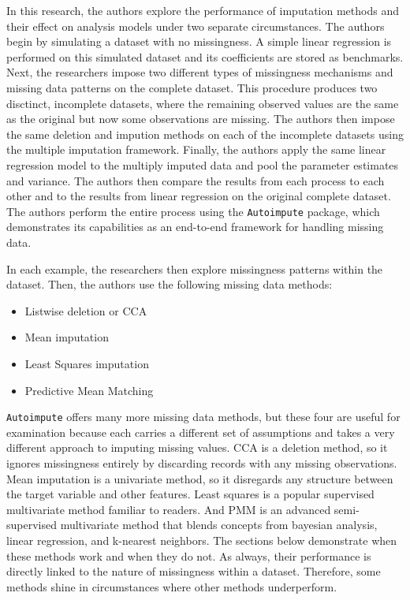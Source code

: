 \documentclass[12pt,oneside]{chicagocapstone}
\providecommand{\tightlist}{%
  \setlength{\itemsep}{0pt}\setlength{\parskip}{0pt}}
\begin{document}
In this research, the authors explore the performance of imputation
methods and their effect on analysis models under two separate
circumstances. The authors begin by simulating a dataset with no
missingness. A simple linear regression is performed on this simulated
dataset and its coefficients are stored as benchmarks. Next, the
researchers impose two different types of missingness mechanisms and
missing data patterns on the complete dataset. This procedure produces
two disctinct, incomplete datasets, where the remaining observed values
are the same as the original but now some observations are missing. The
authors then impose the same deletion and impution methods on each of
the incomplete datasets using the multiple imputation framework.
Finally, the authors apply the same linear regression model to the
multiply imputed data and pool the parameter estimates and variance. The
authors then compare the results from each process to each other and to
the results from linear regression on the original complete dataset. The
authors perform the entire process using the \texttt{Autoimpute}
package, which demonstrates its capabilities as an end-to-end framework
for handling missing data.

In each example, the researchers then explore missingness patterns
within the dataset. Then, the authors use the following missing data
methods:
\begin{itemize}
\tightlist
\item
  Listwise deletion or CCA
\item
  Mean imputation
\item
  Least Squares imputation
\item
  Predictive Mean Matching
\end{itemize}
\texttt{Autoimpute} offers many more missing data methods, but these
four are useful for examination because each carries a different set of
assumptions and takes a very different approach to imputing missing
values. CCA is a deletion method, so it ignores missingness entirely by
discarding records with any missing observations. Mean imputation is a
univariate method, so it disregards any structure between the target
variable and other features. Least squares is a popular supervised
multivariate method familiar to readers. And PMM is an advanced
semi-supervised multivariate method that blends concepts from bayesian
analysis, linear regression, and k-nearest neighbors. The sections below
demonstrate when these methods work and when they do not. As always,
their performance is directly linked to the nature of missingness within
a dataset. Therefore, some methods shine in circumstances where other
methods underperform.
\end{document}

